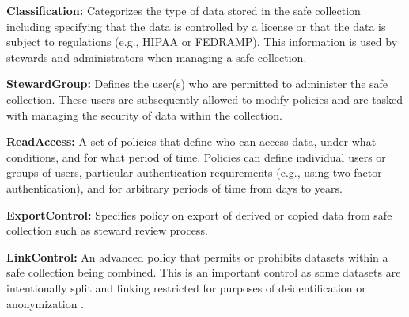 \textbf{Classification:} Categorizes the type of data stored in the
safe collection including specifying that the data is controlled by
a license or that the data is subject to regulations (e.g., HIPAA or FEDRAMP).
This information is used by stewards and administrators when
managing a safe collection.

\textbf{StewardGroup:} Defines the user(s) who are permitted to
administer the safe collection. These users are subsequently
allowed to modify policies and are tasked with managing the
security of data within the collection.

\textbf{ReadAccess:} A set of policies that define who can
access data, under what conditions, and for what period of time.
Policies can define individual users or groups of users, particular
authentication requirements (e.g., using two factor authentication),
and for arbitrary periods of time from days to years.

\textbf{ExportControl:} Specifies policy on export of derived or copied data
from safe collection such as steward review process.

\textbf{LinkControl:} An advanced policy that permits
or prohibits datasets within a safe collection being
combined. This is an important control as some datasets
are intentionally split and linking restricted for purposes
of deidentification or anonymization .



